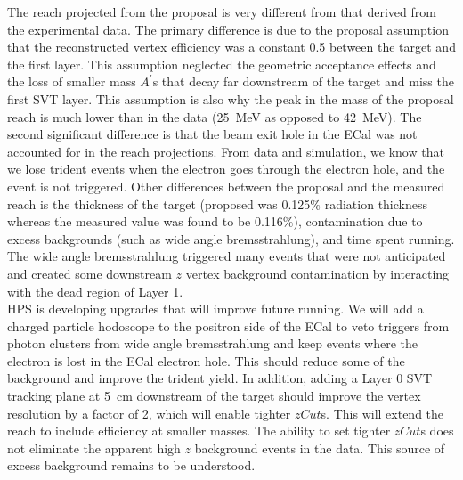 The reach projected from the proposal is very different from that derived from the experimental data. The primary difference is due to the proposal assumption that the reconstructed vertex efficiency was a constant 0.5 between the target and the first layer. This assumption neglected the geometric acceptance effects and the loss of smaller mass $A^{\prime}$s that decay far downstream of the target and miss the first SVT layer. This assumption is also why the peak in the mass of the proposal reach is much lower than in the data (25~MeV as opposed to 42~MeV). The second significant difference is that the beam exit hole in the ECal was not accounted for in the reach projections. From data and simulation, we know that we lose trident events when the electron goes through the electron hole, and the event is not triggered. Other differences between the proposal and the measured reach is the thickness of the target (proposed was 0.125$\%$ radiation thickness whereas the measured value was found to be 0.116$\%$), contamination due to excess backgrounds (such as wide angle bremsstrahlung), and time spent running. The wide angle bremsstrahlung triggered many events that were not anticipated and created some downstream $z$ vertex background contamination by interacting with the dead region of Layer 1. \\
\indent HPS is developing upgrades that will improve future running. We will add a charged particle hodoscope to the positron side of the ECal to veto triggers from photon clusters from wide angle bremsstrahlung and keep events where the electron is lost in the ECal electron hole. This should reduce some of the background and improve the trident yield. In addition, adding a Layer 0 SVT tracking plane at 5~cm downstream of the target should improve the vertex resolution by a factor of 2, which will enable tighter $zCut$s. This will extend the reach to include efficiency at smaller masses. The ability to set tighter $zCut$s does not eliminate the apparent high $z$ background events in the data. This source of excess background remains to be understood.

